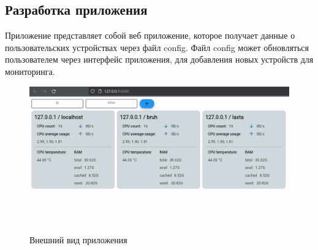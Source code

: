\subsection*{Разработка приложения}

Приложение представляет собой веб приложение, которое получает данные о пользовательских устройствах через файл config.
Файл config может обновляться пользователем через интерфейс приложения, для добавления новых устройств для мониторинга.

\begin{figure}[H]
    \centering
    \includegraphics*[width=1\textwidth]{./img/image_2024-04-07_22-06-12.png}
    \caption{Внешний вид приложения}
\end{figure}





